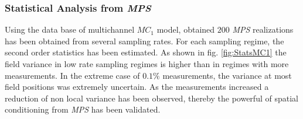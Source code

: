 \subsubsection{Statistical Analysis from \emph{MPS}}

Using the data base of multichannel \emph{$MC_{1}$} model, obtained $200$ \emph{MPS} realizations has been obtained from several sampling rates. For each sampling regime, the second order statistics has been estimated. As shown in fig. \ref{fig:StatsMC1} the field variance in low rate sampling regimes is higher than in regimes with more measurements. In the extreme case of $0.1 \% $ measurements, the variance at most field positions was extremely uncertain. As the measurements increased a reduction of non local variance has been observed, thereby the powerful of spatial conditioning from \emph{MPS} has been validated.


